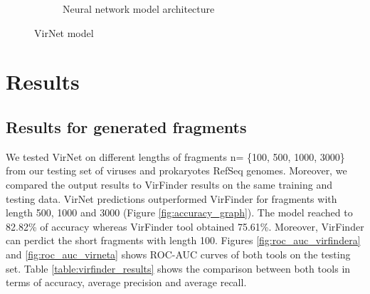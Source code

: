 \documentclass[conference]{IEEEtran}
\begin{document}
\begin{figure}[!htbp]
\begin{subfigure}{0.4\textwidth}
		\caption{Neural network model architecture} 
		\label{fig:model_diagram}
	\end{subfigure}
	\caption{VirNet model} 
	\label{fig:model_arch}
\end{figure}

\section{Results}

\subsection{Results for generated fragments}
We tested VirNet on different lengths of fragments n= \{100, 500, 1000, 3000\} from our testing set of viruses and prokaryotes RefSeq genomes. Moreover, we compared the output results to VirFinder results on the same training and testing data. VirNet predictions outperformed VirFinder for fragments with length 500, 1000 and 3000 (Figure \ref{fig:accuracy_graph}). The model reached to 82.82\% of accuracy whereas VirFinder tool obtained 75.61\%. Moreover, VirFinder can perdict the short fragments with length 100. Figures \ref{fig:roc_auc_virfindera} and \ref{fig:roc_auc_virneta} shows ROC-AUC curves of both tools on the testing set. Table \ref{table:virfinder_results} shows the comparison between both tools in terms of accuracy, average precision and average recall.

\end{document}
